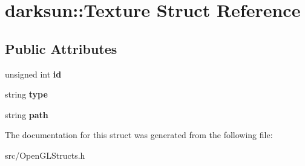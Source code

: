 \hypertarget{structdarksun_1_1_texture}{}\section{darksun\+::Texture Struct Reference}
\label{structdarksun_1_1_texture}
\subsection*{Public Attributes}
\begin{DoxyCompactItemize}
\item 
\mbox{\label{structdarksun_1_1_texture_ae289d8c93c741e45738ca8fa9110cbcd}} 
unsigned int {\bfseries id}
\item 
\mbox{\label{structdarksun_1_1_texture_af39288ec675d4dc64dd69e03ceae4aa4}} 
string {\bfseries type}
\item 
\mbox{\label{structdarksun_1_1_texture_a7b1aa06d7bd662caf87eb2cff43198d7}} 
string {\bfseries path}
\end{DoxyCompactItemize}


The documentation for this struct was generated from the following file\+:\begin{DoxyCompactItemize}
\item 
src/Open\+G\+L\+Structs.\+h\end{DoxyCompactItemize}
